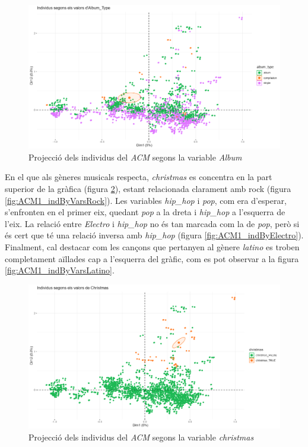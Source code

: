 \begin{figure}[H]
    \centering
    \includegraphics[width=0.7\linewidth]{Images/6_Factorial_Methods/ACM/ACM1_indByVarsAlbum.png}
    \caption{Projecció dels individus del \textit{ACM} segons la variable \textit{Album}}
    \label{fig:ACM1_indByVarsAlbum}
\end{figure}

En el que als gèneres musicals respecta, \textit{christmas} es concentra en la part superior de la gràfica (figura \ref{fig:ACM1_indByVarsChristmas}), estant relacionada clarament amb rock (figura \ref{fig:ACM1_indByVarsRock}). Les variables \textit{hip\_hop} i \textit{pop}, com era d'esperar, s'enfronten en el primer eix, quedant \textit{pop} a la dreta i \textit{hip\_hop} a l'esquerra de l'eix. La relació entre \textit{Electro} i \textit{hip\_hop} no és tan marcada com la de \textit{pop}, però si és cert que té una relació inversa amb \textit{hip\_hop} (figura \ref{fig:ACM1_indByElectro}). Finalment, cal destacar com les cançons que pertanyen al gènere \textit{latino} es troben completament aïllades cap a l'esquerra del gràfic, com es pot observar a la figura \ref{fig:ACM1_indByVarsLatino}.

\begin{figure}[H]
    \centering
    \includegraphics[width=0.7\linewidth]{Images/6_Factorial_Methods/ACM/ACM1_indByVarsChristmas.png}
    \caption{Projecció dels individus del \textit{ACM} segons la variable \textit{christmas}}
    \label{fig:ACM1_indByVarsChristmas}
\end{figure}

